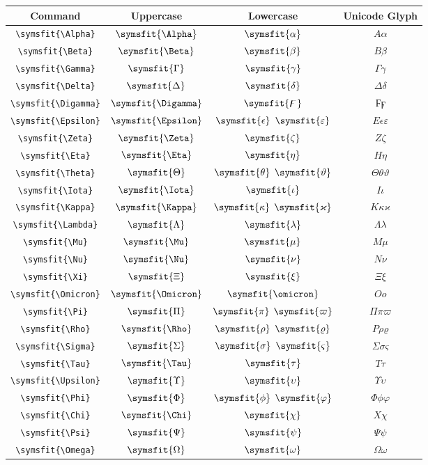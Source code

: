 \documentclass[12pt,a4paper]{article}
\begin{document}
\begin{longtable}{|c|c|c|c|}
\hline
\textbf{Command} & \textbf{Uppercase} & \textbf{Lowercase} & \textbf{Unicode Glyph} \\
\hline
\verb|\symsfit{\Alpha}| & $\symsfit{\Alpha}$ & $\symsfit{\alpha}$ & $ Α 𝛼 $ \\
\verb|\symsfit{\Beta}| & $\symsfit{\Beta}$ & $\symsfit{\beta}$ & $ Β 𝛽 $ \\
\verb|\symsfit{\Gamma}| & $\symsfit{\Gamma}$ & $\symsfit{\gamma}$ & $ Γ 𝛾 $ \\
\verb|\symsfit{\Delta}| & $\symsfit{\Delta}$ & $\symsfit{\delta}$ & $ Δ 𝛿 $ \\
\verb|\symsfit{\Digamma}| & $\symsfit{\Digamma}$ & $\symsfit{\digamma}$ & $ Ϝ ϝ $ \\
\verb|\symsfit{\Epsilon}| & $\symsfit{\Epsilon}$ & $\symsfit{\epsilon}$ $\symsfit{\varepsilon}$ & $ Ε 𝜖 𝜀 $ \\
\verb|\symsfit{\Zeta}| & $\symsfit{\Zeta}$ & $\symsfit{\zeta}$ & $ Ζ 𝜁 $ \\
\verb|\symsfit{\Eta}| & $\symsfit{\Eta}$ & $\symsfit{\eta}$ & $ Η 𝜂 $ \\
\verb|\symsfit{\Theta}| & $\symsfit{\Theta}$ & $\symsfit{\theta}$ $\symsfit{\vartheta}$ & $ Θ 𝜃 𝜗 $ \\
\verb|\symsfit{\Iota}| & $\symsfit{\Iota}$ & $\symsfit{\iota}$ & $ Ι 𝜄 $ \\
\verb|\symsfit{\Kappa}| & $\symsfit{\Kappa}$ & $\symsfit{\kappa}$ $\symsfit{\varkappa}$ & $ Κ 𝜅 𝜘 $ \\
\verb|\symsfit{\Lambda}| & $\symsfit{\Lambda}$ & $\symsfit{\lambda}$ & $ Λ 𝜆 $ \\
\verb|\symsfit{\Mu}| & $\symsfit{\Mu}$ & $\symsfit{\mu}$ & $ Μ 𝜇 $ \\
\verb|\symsfit{\Nu}| & $\symsfit{\Nu}$ & $\symsfit{\nu}$ & $ Ν 𝜈 $ \\
\verb|\symsfit{\Xi}| & $\symsfit{\Xi}$ & $\symsfit{\xi}$ & $ Ξ 𝜉 $ \\
\verb|\symsfit{\Omicron}| & $\symsfit{\Omicron}$ & $\symsfit{\omicron}$ & $ Ο 𝜊 $ \\
\verb|\symsfit{\Pi}| & $\symsfit{\Pi}$ & $\symsfit{\pi}$ $\symsfit{\varpi}$ & $ Π 𝜋 𝜛 $ \\
\verb|\symsfit{\Rho}| & $\symsfit{\Rho}$ & $\symsfit{\rho}$ $\symsfit{\varrho}$ & $ Ρ 𝜌 𝜚 $ \\
\verb|\symsfit{\Sigma}| & $\symsfit{\Sigma}$ & $\symsfit{\sigma}$ $\symsfit{\varsigma}$ & $ Σ 𝜎 𝜍 $ \\
\verb|\symsfit{\Tau}| & $\symsfit{\Tau}$ & $\symsfit{\tau}$ & $ Τ 𝜏 $ \\
\verb|\symsfit{\Upsilon}| & $\symsfit{\Upsilon}$ & $\symsfit{\upsilon}$ & $ Υ 𝜐 $ \\
\verb|\symsfit{\Phi}| & $\symsfit{\Phi}$ & $\symsfit{\phi}$ $\symsfit{\varphi}$ & $ Φ 𝜙 𝜑 $ \\
\verb|\symsfit{\Chi}| & $\symsfit{\Chi}$ & $\symsfit{\chi}$ & $ Χ 𝜒 $ \\
\verb|\symsfit{\Psi}| & $\symsfit{\Psi}$ & $\symsfit{\psi}$ & $ Ψ 𝜓 $ \\
\verb|\symsfit{\Omega}| & $\symsfit{\Omega}$ & $\symsfit{\omega}$ & $ Ω 𝜔 $ \\
\hline
\end{longtable}
\end{document}
